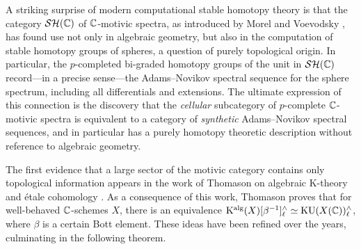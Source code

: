 
A striking surprise of modern computational stable homotopy theory is that the category $\mathcal{SH}(\mathbb{C})$ of $\mathbb{C}$-motivic spectra, as introduced by Morel and Voevodsky \cite{MorelVoevodsky},
has found use not only in algebraic geometry, but also in the computation of stable homotopy groups of spheres, a question of purely topological origin.  In particular, the $p$-completed bi-graded homotopy groups of the unit in $\mathcal{SH}(\mathbb{C})$ record---in a precise sense---the Adams--Novikov spectral sequence for the sphere spectrum, including all differentials and extensions.  The ultimate expression of this connection is the discovery that the \emph{cellular} subcategory of $p$-complete $\mathbb{C}$-motivic spectra is equivalent to a category of \emph{synthetic} Adams--Novikov spectral sequences, and in particular has a purely homotopy theoretic description without reference to algebraic geometry.


The first evidence that a large sector of the motivic category contains only topological information appears in the work of Thomason on algebraic K-theory and \'etale cohomology \cite{Thomason}. As a consequence of this work, Thomason proves that for well-behaved $\mathbb{C}$-schemes $X$, there is an equivalence $\mathrm{K}^{\mathrm{alg}} (X) [\beta^{-1}]^{\wedge} _{\ell} \simeq \mathrm{KU} (X(\mathbb{C}))^{\wedge} _{\ell}$, where $\beta$ is a certain Bott element. %
These ideas have been refined over the years, culminating in the following theorem.

